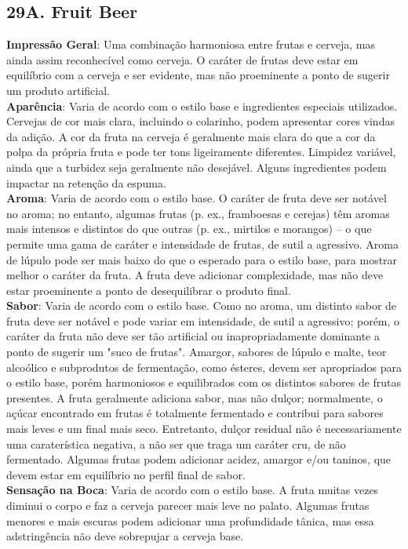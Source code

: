 \subsection*{29A. Fruit Beer}
\textbf{Impressão Geral}: Uma combinação harmoniosa entre frutas e cerveja, mas ainda assim reconhecível como cerveja. O caráter de frutas deve estar em equilíbrio com a cerveja e ser evidente, mas não proeminente a ponto de sugerir um produto artificial. \\
\textbf{Aparência}: Varia de acordo com o estilo base e ingredientes especiais utilizados. Cervejas de cor mais clara, incluindo o colarinho, podem apresentar cores vindas da adição. A cor da fruta na cerveja é geralmente mais clara do que a cor da polpa da própria fruta e pode ter tons ligeiramente diferentes. Limpidez variável, ainda que a turbidez seja geralmente não desejável. Alguns ingredientes podem impactar na retenção da espuma. \\
\textbf{Aroma}: Varia de acordo com o estilo base. O caráter de fruta deve ser notável no aroma; no entanto, algumas frutas (p. ex., framboesas e cerejas) têm aromas mais intensos e distintos do que outras (p. ex., mirtilos e morangos) – o que permite uma gama de caráter e intensidade de frutas, de sutil a agressivo. Aroma de lúpulo pode ser mais baixo do que o esperado para o estilo base, para mostrar melhor o caráter da fruta. A fruta deve adicionar complexidade, mas não deve estar proeminente a ponto de desequilibrar o produto final. \\
\textbf{Sabor}: Varia de acordo com o estilo base. Como no aroma, um distinto sabor de fruta deve ser notável e pode variar em intensidade, de sutil a agressivo; porém, o caráter da fruta não deve ser tão artificial ou inapropriadamente dominante a ponto de sugerir um "suco de frutas". Amargor, sabores de lúpulo e malte, teor alcoólico e subprodutos de fermentação, como ésteres, devem ser apropriados para o estilo base, porém harmoniosos e equilibrados com os distintos sabores de frutas presentes. A fruta geralmente adiciona sabor, mas não dulçor; normalmente, o açúcar encontrado em frutas é totalmente fermentado e contribui para sabores mais leves e um final mais seco. Entretanto, dulçor residual não é necessariamente uma caraterística negativa, a não ser que traga um caráter cru, de não fermentado. Algumas frutas podem adicionar acidez, amargor e/ou taninos, que devem estar em equilíbrio no perfil final de sabor. \\
\textbf{Sensação na Boca}: Varia de acordo com o estilo base. A fruta muitas vezes diminui o corpo e faz a cerveja parecer mais leve no palato. Algumas frutas menores e mais escuras podem adicionar uma profundidade tânica, mas essa adstringência não deve sobrepujar a cerveja base. \\

